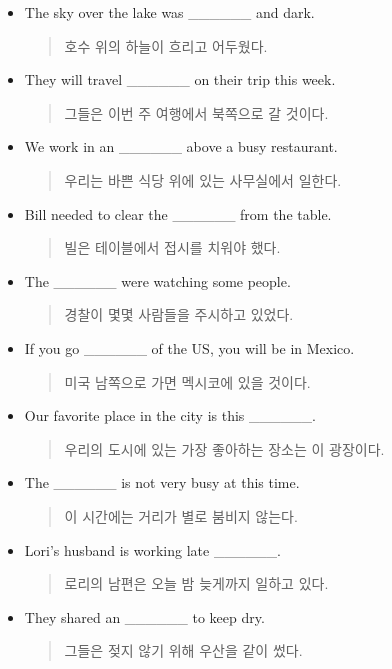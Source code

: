 \documentclass{article}
\begin{document}
\begin{addmargin}[1em]{1em}
\begin{itemize}
\begin{quote}
    \end{quote}
    \item The sky over the lake was \_\_\_\_\_\_ and dark.
    \begin{quote}
    호수 위의 하늘이 흐리고 어두웠다.
    \end{quote}
    \item They will travel \_\_\_\_\_\_ on their trip this week.
    \begin{quote}
    그들은 이번 주 여행에서 북쪽으로 갈 것이다.
    \end{quote}
    \item We work in an \_\_\_\_\_\_ above a busy restaurant.
    \begin{quote}
    우리는 바쁜 식당 위에 있는 사무실에서 일한다.
    \end{quote}
    \item Bill needed to clear the \_\_\_\_\_\_ from the table.
    \begin{quote}
    빌은 테이블에서 접시를 치워야 했다.
    \end{quote}
    \item The \_\_\_\_\_\_ were watching some people.
    \begin{quote}
    경찰이 몇몇 사람들을 주시하고 있었다.
    \end{quote}
    \item If you go \_\_\_\_\_\_ of the US, you will be in Mexico.
    \begin{quote}
    미국 남쪽으로 가면 멕시코에 있을 것이다.
    \end{quote}
    \item Our favorite place in the city is this \_\_\_\_\_\_.
    \begin{quote}
    우리의 도시에 있는 가장 좋아하는 장소는 이 광장이다.
    \end{quote}
    \item The \_\_\_\_\_\_ is not very busy at this time.
    \begin{quote}
    이 시간에는 거리가 별로 붐비지 않는다.
    \end{quote}
    \item Lori's husband is working late \_\_\_\_\_\_.
    \begin{quote}
    로리의 남편은 오늘 밤 늦게까지 일하고 있다.
    \end{quote}
    \item They shared an \_\_\_\_\_\_ to keep dry.
    \begin{quote}
    그들은 젖지 않기 위해 우산을 같이 썼다.
    \end{quote}
\end{itemize}
\end{addmargin}
\end{document}
